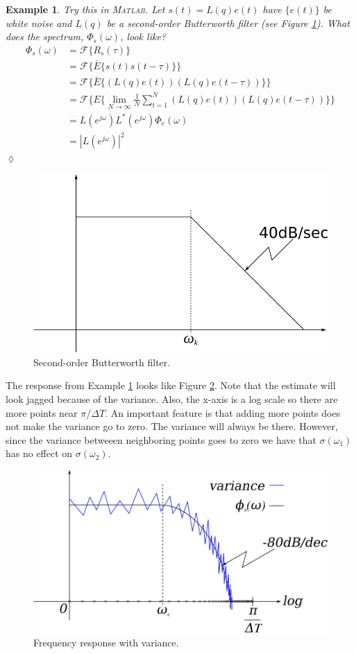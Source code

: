 \documentclass[lecture,12pt,]{pcms-l}
\theoremstyle{example}
\newtheorem{example}{Example}[section]
\newcommand{\w}{\omega}
\newcommand{\dt}{\Delta T}
\begin{document}
\begin{example}
\label{ex:sSpectrum}
Try this in \textsc{Matlab}. Let $s(t)=L(q)e(t)$ have $\{e(t)\}$ be white noise and $L(q)$ be a second-order Butterworth filter (see Figure \ref{fig:06butterworthFilter}). What does the spectrum, $\Phi_s(\w)$, look like?
\begin{align*}
\Phi_s(\w) &= \mathcal{F}\{R_s(\tau)\} \\
&= \mathcal{F}\{\bar{E}\{s(t)s(t-\tau)\}\} \\
&= \mathcal{F}\{\bar{E}\{(L(q)e(t))(L(q)e(t-\tau))\}\} \\
&= \mathcal{F}\{E\{\lim_{N\to\infty}\frac{1}{N}\sum_{t=1}^N(L(q)e(t))(L(q)e(t-\tau))\}\} \\
&= L(e^{j\w})L^*(e^{j\w})\Phi_e(\w) \\
&= |L(e^{j\w})|^2
\end{align*}
$\lozenge$
\end{example}

\begin{figure}[ht!]
	\centering
	\includegraphics[width=.4\textwidth]{images/06butterworthFilter}
	\caption{Second-order Butterworth filter.}
	\label{fig:06butterworthFilter}
\end{figure}

The response from Example \ref{ex:sSpectrum} looks like Figure \ref{fig:06freqResp}. Note that the estimate will look jagged because of the variance. Also, the x-axis is a log scale so there are more points near $\pi/\dt$. An important feature is that adding more points does not make the variance go to zero. The variance will always be there. However, since the variance betweeen neighboring points goes to zero we have that $\sigma(\w_1)$ has no effect on $\sigma(\w_2)$.

\begin{figure}[ht!]
	\centering
	\includegraphics[width=.5\textwidth]{images/06freqResp}
	\caption{Frequency response with variance.}
	\label{fig:06freqResp}
\end{figure}
\end{document}
